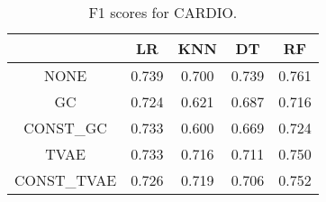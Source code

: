 \begin{table}
\caption{F1 scores for CARDIO.}
\label{tab:f1-CARDIO}
\begin{tabular}{ccccc}
\toprule
 & LR & KNN & DT & RF \\
\midrule
NONE & 0.739 & 0.700 & 0.739 & 0.761 \\
GC & 0.724 & 0.621 & 0.687 & 0.716 \\
CONST\_GC & 0.733 & 0.600 & 0.669 & 0.724 \\
TVAE & 0.733 & 0.716 & 0.711 & 0.750 \\
CONST\_TVAE & 0.726 & 0.719 & 0.706 & 0.752 \\
\bottomrule
\end{tabular}
\end{table}
